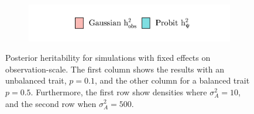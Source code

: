 \begin{figure}
\begin{subfigure}{0.49\textwidth}
    \label{fig:fixedeffects probit vs gaussian:hVAhP}
    \end{subfigure}
    \begin{subfigure}{0.6\textwidth}
    \includegraphics[width=\textwidth]{figures/fixedeffects_gaussian_probit_legend.pdf}
    \end{subfigure}
    \caption[$h^2$ for fixed effects simulation models]{Posterior heritability for simulations with fixed effects on observation-scale. The first column shows the results with an unbalanced trait, $p=0.1$, and the other column for a balanced trait $p=0.5$. Furthermore, the first row show densities where $\sigma^2_A=10$, and the second row when $\sigma^2_A=500$.}
    \label{fig:fixedeffects probit vs gaussian}
\end{figure}


